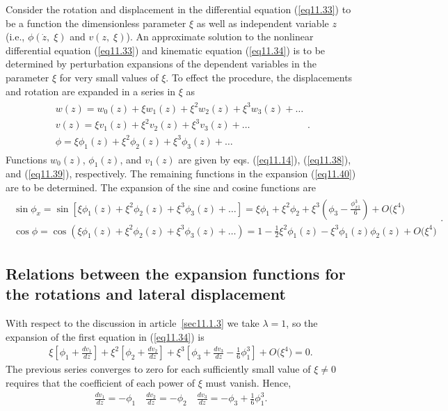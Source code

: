\documentclass{AeroStructure-ERJohnson}
\begin{document}
Consider the rotation and displacement in the differential equation (\ref{eq11.33}) to be a function the dimensionless parameter $ \xi $ as well as independent variable $z$ (i.e., $ \phi(\dot{z},\;\xi) $ and $ v(z,\;\xi)$). An approximate solution to the nonlinear differential equation (\ref{eq11.33}) and kinematic equation (\ref{eq11.34}) is to be determined by perturbation expansions of the dependent variables in the parameter $ \xi $ for very small values of $ \xi $. To effect the procedure, the displacements and rotation are expanded in a series in $ \xi $ as
\begin{align}\label{eq11.40}
 \begin{gathered} w(z)=w_{0}(z)+\xi w_{1}(z)+\xi^{2} w_{2}(z)+\xi^{3} w_{3}(z)+\ldots \\ v(z)=\xi v_{1}(z)+\xi^{2} v_{2}(z)+\xi^{3} v_{3}(z)+\ldots \\ \phi=\xi \phi_{1}(z)+\xi^{2} \phi_{2}(z)+\xi^{3} \phi_{3}(z)+\ldots \end{gathered}.
\end{align}
Functions $w_{0}(z)$, $\phi_{1}(z)$, and $v_{1}(z)$ are given by eqs. (\ref{eq11.14}), (\ref{eq11.38}), and (\ref{eq11.39}), respectively. The remaining functions in the expansion (\ref{eq11.40}) are to be determined. The expansion of the sine and cosine functions are
\begin{align}
\begin{gathered} \sin \phi_{x}=\sin \left[\xi \phi_{1}(z)+\xi^{2} \phi_{2}(z)+\xi^{3} \phi_{3}(z)+\ldots\right]=\xi \phi_{1}+\xi^{2} \phi_{2}+\xi^{3}\left(\phi_{3}-\frac{\phi_{x 1}^{3}}{6}\right)+O\big(\xi^{4}\big) \\
\cos \phi=\cos (\xi \phi_{1}(z)+\xi^{2} \phi_{2}(z)+\xi^{3} \phi_{3}(z)+\ldots)=1-\frac{1}{2} \xi^{2} \phi_{1}(z)-\xi^{3} \phi_{1}(z) \phi_{2}(z)+O\big(\xi^{4}\big) \end{gathered}. \label{eq11.41}
\end{align}

\subsection{Relations between the expansion functions for the rotations and lateral displacement}\label{sec11.2.3}

With respect to the discussion in article~\ref{sec11.1.3} we take $\lambda=1$, so the expansion of the first equation in (\ref{eq11.34}) is
\begin{align}\label{eq11.42}
 \xi\left[\phi_{1}+\frac{d v_{1}}{d z}\right]+\xi^{2}\left[\phi_{2}+\frac{d v_{2}}{d z}\right]+\xi^{3}\left[\phi_{3}+\frac{d v_{3}}{d z}-\frac{1}{6} \phi_{1}^{3}\right]+O\big(\xi^{4}\big)=0.
\end{align}
The previous series converges to zero for each sufficiently small value of $ \xi \neq 0 $ requires that the coefficient of each power of $ \xi $ must vanish. Hence,
\begin{align}\label{eq11.43}
 \frac{d v_{1}}{d z}=-\phi_{1} \quad \frac{d v_{2}}{d z}=-\phi_{2} \quad \frac{d v_{3}}{d z}=-\phi_{3}+\frac{1}{6} \phi_{1}^{3}.
\end{align}
\end{document}

